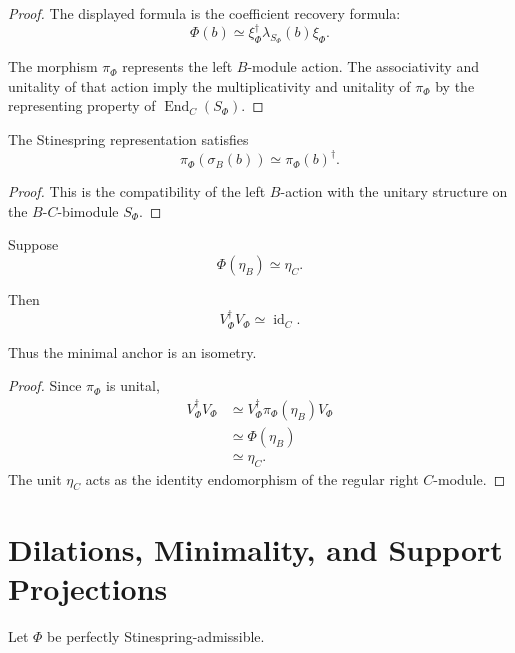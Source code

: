 \begin{proof}
The displayed formula is the coefficient recovery formula:
\[
  \Phi(b)
  \simeq
  \xi_\Phi^\dagger\lambda_{S_\Phi}(b)\xi_\Phi.
\]

The morphism \(\pi_\Phi\) represents the left \(B\)-module action. The
associativity and unitality of that action imply the multiplicativity and
unitality of \(\pi_\Phi\) by the representing property of
\(\operatorname{End}_C(S_\Phi)\).
\end{proof}

\begin{proposition}
\label{prop:higher-stinespring-representation-hermitian}
The Stinespring representation satisfies
\[
  \pi_\Phi(\sigma_B(b))
  \simeq
  \pi_\Phi(b)^\dagger.
\]
\end{proposition}

\begin{proof}
This is the compatibility of the left \(B\)-action with the unitary structure
on the \(B\)-\(C\)-bimodule \(S_\Phi\).
\end{proof}

\begin{proposition}
\label{prop:higher-normalized-anchor-isometry}
Suppose
\[
  \Phi(\eta_B)
  \simeq
  \eta_C.
\]

Then
\[
  V_\Phi^\dagger V_\Phi
  \simeq
  \operatorname{id}_C.
\]

Thus the minimal anchor is an isometry.
\end{proposition}

\begin{proof}
Since \(\pi_\Phi\) is unital,
\[
\begin{aligned}
  V_\Phi^\dagger V_\Phi
  &\simeq
  V_\Phi^\dagger
  \pi_\Phi(\eta_B)
  V_\Phi
  \\
  &\simeq
  \Phi(\eta_B)
  \\
  &\simeq
  \eta_C.
\end{aligned}
\]
The unit \(\eta_C\) acts as the identity endomorphism of the regular right
\(C\)-module.
\end{proof}

\section{Dilations, Minimality, and Support Projections}
\label{sec:higher-dilations-minimality}

Let \(\Phi\) be perfectly Stinespring-admissible.

